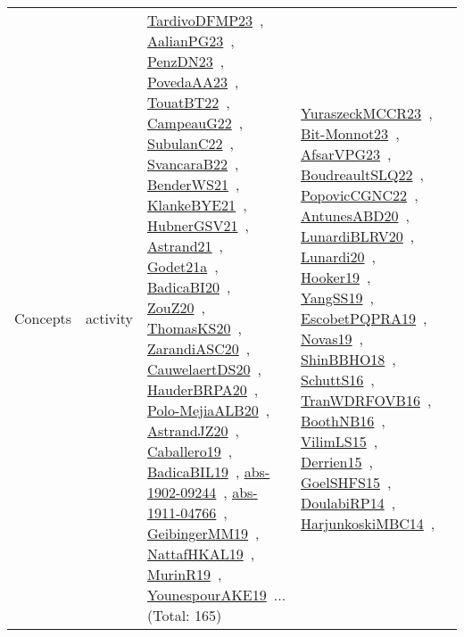 {\begin{longtable}{lp{3cm}>{\raggedright\arraybackslash}p{6cm}>{\raggedright\arraybackslash}p{6cm}>{\raggedright\arraybackslash}p{8cm}}
Concepts & activity & \href{works/TardivoDFMP23.pdf}{TardivoDFMP23}~\cite{TardivoDFMP23}, \href{works/AalianPG23.pdf}{AalianPG23}~\cite{AalianPG23}, \href{works/PenzDN23.pdf}{PenzDN23}~\cite{PenzDN23}, \href{works/PovedaAA23.pdf}{PovedaAA23}~\cite{PovedaAA23}, \href{works/TouatBT22.pdf}{TouatBT22}~\cite{TouatBT22}, \href{works/CampeauG22.pdf}{CampeauG22}~\cite{CampeauG22}, \href{works/SubulanC22.pdf}{SubulanC22}~\cite{SubulanC22}, \href{works/SvancaraB22.pdf}{SvancaraB22}~\cite{SvancaraB22}, \href{works/BenderWS21.pdf}{BenderWS21}~\cite{BenderWS21}, \href{works/KlankeBYE21.pdf}{KlankeBYE21}~\cite{KlankeBYE21}, \href{works/HubnerGSV21.pdf}{HubnerGSV21}~\cite{HubnerGSV21}, \href{works/Astrand21.pdf}{Astrand21}~\cite{Astrand21}, \href{works/Godet21a.pdf}{Godet21a}~\cite{Godet21a}, \href{works/BadicaBI20.pdf}{BadicaBI20}~\cite{BadicaBI20}, \href{works/ZouZ20.pdf}{ZouZ20}~\cite{ZouZ20}, \href{works/ThomasKS20.pdf}{ThomasKS20}~\cite{ThomasKS20}, \href{works/ZarandiASC20.pdf}{ZarandiASC20}~\cite{ZarandiASC20}, \href{works/CauwelaertDS20.pdf}{CauwelaertDS20}~\cite{CauwelaertDS20}, \href{works/HauderBRPA20.pdf}{HauderBRPA20}~\cite{HauderBRPA20}, \href{works/Polo-MejiaALB20.pdf}{Polo-MejiaALB20}~\cite{Polo-MejiaALB20}, \href{works/AstrandJZ20.pdf}{AstrandJZ20}~\cite{AstrandJZ20}, \href{works/Caballero19.pdf}{Caballero19}~\cite{Caballero19}, \href{works/BadicaBIL19.pdf}{BadicaBIL19}~\cite{BadicaBIL19}, \href{works/abs-1902-09244.pdf}{abs-1902-09244}~\cite{abs-1902-09244}, \href{works/abs-1911-04766.pdf}{abs-1911-04766}~\cite{abs-1911-04766}, \href{works/GeibingerMM19.pdf}{GeibingerMM19}~\cite{GeibingerMM19}, \href{works/NattafHKAL19.pdf}{NattafHKAL19}~\cite{NattafHKAL19}, \href{works/MurinR19.pdf}{MurinR19}~\cite{MurinR19}, \href{works/YounespourAKE19.pdf}{YounespourAKE19}~\cite{YounespourAKE19}... (Total: 165) & \href{works/YuraszeckMCCR23.pdf}{YuraszeckMCCR23}~\cite{YuraszeckMCCR23}, \href{works/Bit-Monnot23.pdf}{Bit-Monnot23}~\cite{Bit-Monnot23}, \href{works/AfsarVPG23.pdf}{AfsarVPG23}~\cite{AfsarVPG23}, \href{works/BoudreaultSLQ22.pdf}{BoudreaultSLQ22}~\cite{BoudreaultSLQ22}, \href{works/PopovicCGNC22.pdf}{PopovicCGNC22}~\cite{PopovicCGNC22}, \href{works/AntunesABD20.pdf}{AntunesABD20}~\cite{AntunesABD20}, \href{works/LunardiBLRV20.pdf}{LunardiBLRV20}~\cite{LunardiBLRV20}, \href{works/Lunardi20.pdf}{Lunardi20}~\cite{Lunardi20}, \href{works/Hooker19.pdf}{Hooker19}~\cite{Hooker19}, \href{works/YangSS19.pdf}{YangSS19}~\cite{YangSS19}, \href{works/EscobetPQPRA19.pdf}{EscobetPQPRA19}~\cite{EscobetPQPRA19}, \href{works/Novas19.pdf}{Novas19}~\cite{Novas19}, \href{works/ShinBBHO18.pdf}{ShinBBHO18}~\cite{ShinBBHO18}, \href{works/SchuttS16.pdf}{SchuttS16}~\cite{SchuttS16}, \href{works/TranWDRFOVB16.pdf}{TranWDRFOVB16}~\cite{TranWDRFOVB16}, \href{works/BoothNB16.pdf}{BoothNB16}~\cite{BoothNB16}, \href{works/VilimLS15.pdf}{VilimLS15}~\cite{VilimLS15}, \href{works/Derrien15.pdf}{Derrien15}~\cite{Derrien15}, \href{works/GoelSHFS15.pdf}{GoelSHFS15}~\cite{GoelSHFS15}, \href{works/DoulabiRP14.pdf}{DoulabiRP14}~\cite{DoulabiRP14}, \href{works/HarjunkoskiMBC14.pdf}{HarjunkoskiMBC14}~\cite{HarjunkoskiMBC14}, 
\end{longtable}}
